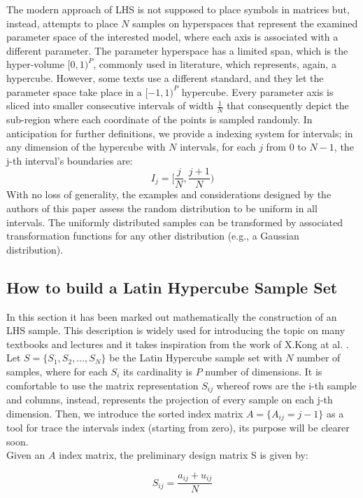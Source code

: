 \documentclass[12pt]{article}
\begin{document}
The modern approach of LHS is not supposed to place symbols in matrices but, instead, attempts to place $N$ samples on hyperspaces that represent the examined parameter space of the interested model, where each axis is associated with a different parameter. The parameter hyperspace has a limited span, which is the hyper-volume $[0,1)^P$, commonly used in literature, which represents, again, a hypercube. However, some texts use a different standard, and they let the parameter space take place in a $[-1,1)^P$ hypercube. Every parameter axis is sliced into smaller consecutive intervals of width $\frac{1}{N}$ that consequently depict the sub-region where each coordinate of the points is sampled randomly. In anticipation for further definitions, we provide a indexing system for intervals; in any dimension of the hypercube with $N$ intervals, for each $j$ from 0 to $N-1$, the j-th interval's boundaries are:
\begin{equation}
\label{eq:interval_index}
I_j = [\frac{j}{N}, \frac{j + 1}{N})
\end{equation}
With no loss of generality, the examples and considerations designed by the authors of this paper assess the random distribution to be uniform in all intervals. The uniformly distributed samples can be transformed by associated transformation functions for any other distribution (e.g., a Gaussian distribution).

\subsection{How to build a Latin Hypercube Sample Set}
In this section it has been marked out mathematically the construction of an LHS sample. This description is widely used for introducing the topic on many textbooks and lectures and it takes inspiration from the work of X.Kong at al. .
Let $S = \{S_1, S_2, ..., S_N\}$ be the Latin Hypercube sample set with $N$ number of samples, where for each $S_i$ its cardinality is $P$ number of dimensions. It is comfortable to use the matrix representation $S_{ij}$ whereof rows are the i-th sample and columns, instead, represents the projection of every sample on each j-th dimension. Then, we introduce the sorted index matrix $A = \{A_{ij} = j - 1\}$ as a tool for trace the intervals index (starting from zero), its purpose will be clearer soon. \\
Given an $A$ index matrix, the preliminary design matrix S is given by: 

\begin{equation}
\label{eq:Sij_def}
S_{ij} = \frac{a_{ij} + u_{ij}}{N}
\end{equation}
\end{document}
